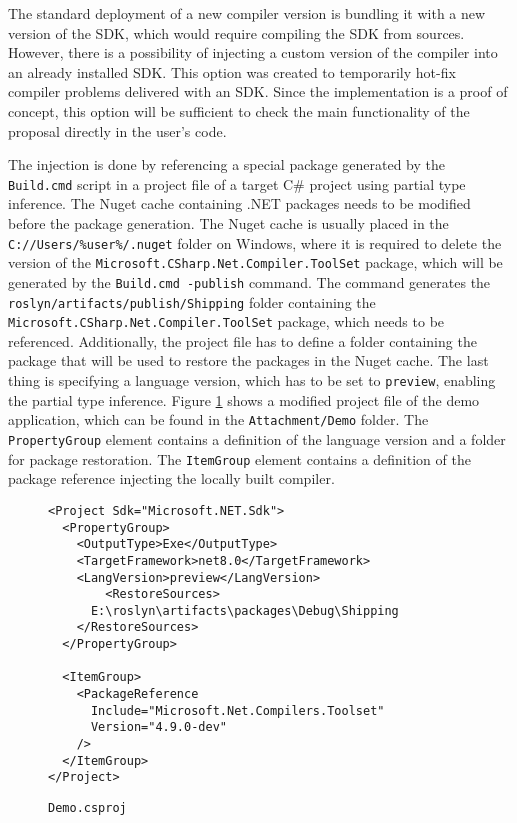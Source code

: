 The standard deployment of a new compiler version is bundling it with a new version of the SDK, which would require compiling the SDK from sources. 
However, there is a possibility of injecting a custom version of the compiler into an already installed SDK. 
This option was created to temporarily hot-fix compiler problems delivered with an SDK. 
Since the implementation is a proof of concept, this option will be sufficient to check the main functionality of the proposal directly in the user’s code.
\par
The injection is done by referencing a special package generated by the\\ \texttt{Build.cmd} script in a project file of a target C\# project using partial type inference. The Nuget cache containing .NET packages needs to be modified before the package generation. 
The Nuget cache is usually placed in the\\ \texttt{C://Users/\%user\%/.nuget} folder on Windows, where it is required to delete the version of the \texttt{Microsoft.CSharp.Net.Compiler.ToolSet} package, which will be generated by the \texttt{Build.cmd -publish} command. 
The command generates the \texttt{roslyn/artifacts/publish/Shipping} folder containing the\\ \texttt{Microsoft.CSharp.Net.Compiler.ToolSet} package, which needs to be referenced. 
Additionally, the project file has to define a folder containing the package that will be used to restore the packages in the Nuget cache. 
The last thing is specifying a language version, which has to be set to \texttt{preview}, enabling the partial type inference. 
Figure \ref{img68:csproj} shows a modified project file of the demo application, which can be found in the \texttt{Attachment/Demo} folder. 
The \texttt{PropertyGroup} element contains a definition of the language version and a folder for package restoration. 
The \texttt{ItemGroup} element contains a definition of the package reference injecting the locally built compiler.
\begin{figure}[h]
\begin{lstlisting}
<Project Sdk="Microsoft.NET.Sdk">
  <PropertyGroup>
    <OutputType>Exe</OutputType>
    <TargetFramework>net8.0</TargetFramework>
    <LangVersion>preview</LangVersion>
        <RestoreSources>
      E:\roslyn\artifacts\packages\Debug\Shipping
    </RestoreSources>
  </PropertyGroup>

  <ItemGroup>
    <PackageReference 
      Include="Microsoft.Net.Compilers.Toolset" 
      Version="4.9.0-dev"
    />
  </ItemGroup>
</Project>
\end{lstlisting}
\caption{\texttt{Demo.csproj}}
\label{img68:csproj}
\end{figure}

